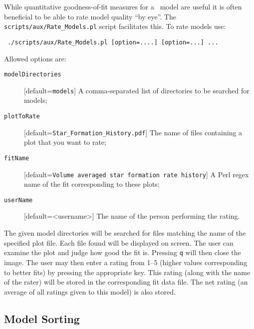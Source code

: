 While quantitative goodness-of-fit measures for a \glc\ model are useful it is often beneficial to be able to rate model quality ``by eye''. The {\tt scripts/aux/Rate\_Models.pl} script facilitates this. To rate models use:
\begin{verbatim}
 ./scripts/aux/Rate_Models.pl [option=....] [option=...] ...
\end{verbatim}
Allowed options are:
\begin{description}
 \item [{\tt modelDirectories}] [default={\tt models}] A comma-separated list of directories to be searched for models;
 \item [{\tt plotToRate}] [default={\tt Star\_Formation\_History.pdf}] The name of files containing a plot that you want to rate;
 \item [{\tt fitName}] [default={\tt Volume averaged star formation rate history}] A Perl regex name of the fit corresponding to these plots;
 \item [{\tt userName}] [default=<username>] The name of the person performing the rating.
\end{description}
The given model directories will be searched for files matching the name of the specified plot file. Each file found will be displayed on screen. The user can examine the plot and judge how good the fit is. Pressing {\tt q} will then close the image. The user may then enter a rating from 1--5 (higher values corresponding to better fits) by pressing the appropriate key. This rating (along with the name of the rater) will be stored in the corresponding fit data file. The net rating (an average of all ratings given to this model) is also stored.

\subsection{Model Sorting}\label{sec:ModelSorting}


